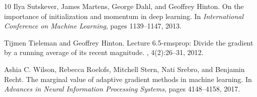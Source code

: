 \documentclass[12pt,a4paper]{article}
\begin{document}
\begin{thebibliography}{10}
Ilya Sutskever, James Martens, George Dahl, and Geoffrey Hinton.
\newblock On the importance of initialization and momentum in deep learning.
\newblock In {\em International Conference on Machine Learning}, pages 1139--1147, 2013.

Tijmen Tieleman and Geoffrey Hinton.
\newblock Lecture 6.5-rmsprop: Divide the gradient by a running average of its recent magnitude.
, 4(2):26--31, 2012.

Ashia C. Wilson, Rebecca Roelofs, Mitchell Stern, Nati Srebro, and Benjamin Recht.
\newblock The marginal value of adaptive gradient methods in machine learning.
\newblock In {\em Advances in Neural Information Processing Systems}, pages 4148--4158, 2017.

\end{thebibliography}
\end{document}
